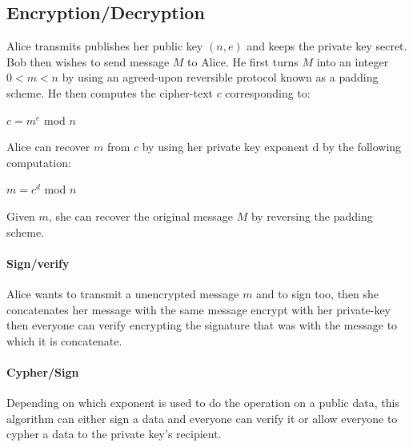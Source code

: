 \subsection*{Encryption/Decryption}
	Alice transmits publishes her public key $(n,e)$ and keeps the private key secret.\\
	Bob then wishes to send message $M$ to Alice.
	He first turns $M$ into an integer $0 < m < n$ by using an agreed-upon reversible 
	protocol known as a padding scheme.	He then computes the cipher-text $c$ corresponding to:
	\begin{center}
		$c = m^e$ mod $n$\\
	\end{center}
	Alice can recover $ m$ from $c$ by using her private key exponent d by the following computation:
	\begin{center}
		$m = c^d$ mod $n$
	\end{center}
	Given $m$, she can recover the original message $M$ by reversing the padding scheme.
	
	\paragraph*{Sign/verify} Alice wants to transmit a unencrypted message $m$ 
	and to sign too, then she concatenates her 	message with the same message 
	encrypt with her private-key then everyone can verify encrypting the signature
	that was with the message to which it is concatenate.

	\paragraph*{Cypher/Sign} 
	Depending on which exponent is used to do the operation on a public data, this algorithm can either sign a data and everyone can verify it or allow everyone to cypher a data to the private key's recipient.

